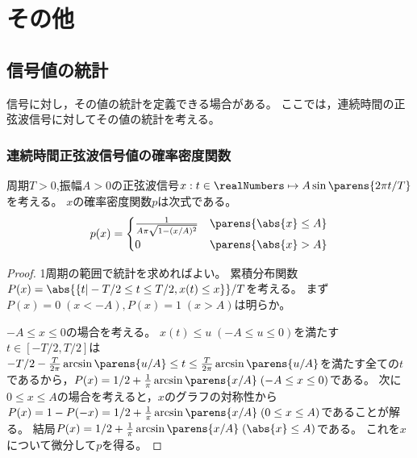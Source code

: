\part{その他}
    \chapter{信号値の統計}
        信号に対し，その値の統計を定義できる場合がある。
        ここでは，連続時間の正弦波信号に対してその値の統計を考える。
        \section{連続時間正弦波信号値の確率密度関数}
            \begin{shadebox}
                周期$T>0$,振幅$A>0$の正弦波信号$x:t\in\realNumbers\mapsto A\sin\parens{2\pi t/T}$を考える。
                $x$の確率密度関数$p$は次式である。
                \[
                    p(x) = \begin{cases}
                        \frac{1}{A\pi\sqrt{1-(x/A)^2}} & \parens{\abs{x} \leq A} \\
                        0 & \parens{\abs{x} > A} \\
                    \end{cases}
                \]
            \end{shadebox}
            \begin{proof}
                1周期の範囲で統計を求めればよい。
                累積分布関数$P(x) = \abs{\{t|-T/2\leq t\leq T/2, x(t) \leq x\}}/T$を考える。
                まず$P(x) = 0\;(x < -A),P(x) = 1\;(x > A)$は明らか。
                \par
                $-A \leq x \leq 0$の場合を考える。
                $x(t) \leq u\;(-A \leq u \leq 0)$を満たす$t\in[-T/2,T/2]$は$-T/2 - \frac{T}{2\pi}\arcsin\parens{u/A}\leq t \leq \frac{T}{2\pi}\arcsin\parens{u/A}$を満たす全ての$t$であるから，$P(x) = 1/2 + \frac{1}{\pi}\arcsin\parens{x/A}\;(-A\leq x\leq 0)$である。
                次に$0 \leq x \leq A$の場合を考えると，$x$のグラフの対称性から$P(x) = 1 - P(-x) = 1/2 + \frac{1}{\pi}\arcsin\parens{x/A}\;(0 \leq x \leq A)$であることが解る。
                結局$P(x) = 1/2 + \frac{1}{\pi}\arcsin\parens{x/A}\;(\abs{x}\leq A)$である。
                これを$x$について微分して$p$を得る。
            \end{proof}
